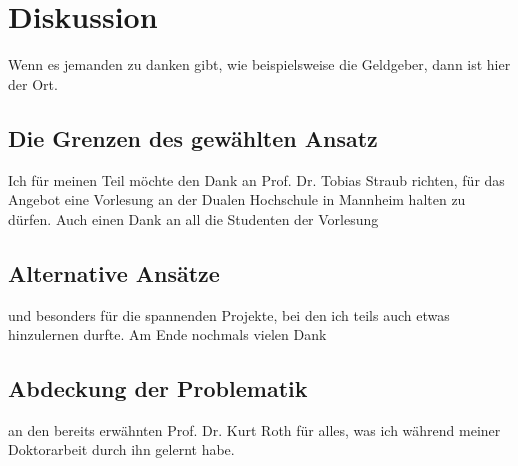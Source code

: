 \section{Diskussion}

Wenn es jemanden zu danken gibt, wie beispielsweise die Geldgeber,
dann ist hier der Ort.

\subsection{Die Grenzen des gewählten Ansatz}

Ich für meinen Teil möchte den Dank an Prof. Dr. Tobias Straub
richten, für das Angebot eine Vorlesung an der Dualen Hochschule in
Mannheim halten zu dürfen. Auch einen Dank an all die Studenten der Vorlesung

\subsection{Alternative Ansätze}

und besonders für die spannenden Projekte, bei den ich teils auch
etwas hinzulernen durfte. Am Ende nochmals vielen Dank

\subsection{Abdeckung der Problematik}

an den bereits erwähnten Prof. Dr. Kurt Roth für alles,
was ich während meiner Doktorarbeit durch ihn gelernt habe.
